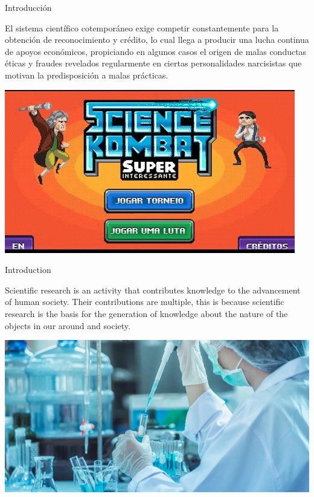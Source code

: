 \begin{frame}{Introducción}
    \begin{minipage}{0.45\linewidth}
        El sistema científico cotemporáneo exige competir constantemente para la obtención de reconocimiento y crédito, lo cual llega a producir una lucha
continua de apoyos económicos, propiciando en algunos casos el origen de malas conductas éticas y fraudes revelados regularmente en ciertas personalidades
narcisistas que motivan la predisposición a malas prácticas.\\
    \end{minipage}
    \hspace{0.5cm}
    \begin{minipage}{0.4\linewidth}
        \centering
        \includegraphics[scale=0.45]{images/ima3.jpg}
    \end{minipage}
\end{frame}
\begin{frame}{Introduction}
    \begin{minipage}{0.4\linewidth}
        Scientific research is an activity that contributes knowledge to the advancement of human society. Their contributions
        are multiple, this is because scientific research is the basis for the generation of knowledge about the nature of the objects in our
        around and society.
    \end{minipage}
    \hspace{0.4cm}
    \begin{minipage}{0.45\linewidth}
        \centering
        \includegraphics[scale=1.2]{images/ima1.jpg}
    \end{minipage}
\end{frame}
